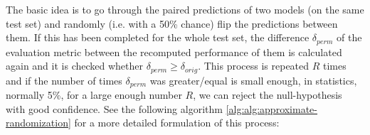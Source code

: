 




The basic idea is to go through the paired predictions of two models (on
the same test set) and
randomly (i.e. with a 50\% chance) flip the predictions between them. If
this has been completed for the whole test set, the difference $\delta_{perm}$ of the
evaluation metric between the recomputed performance of them is calculated again
and it is checked whether $\delta_{perm} \geq \delta_{orig}$. This process is repeated
$R$ times and if the number of times $\delta_{perm}$ was greater/equal is small
enough, in statistics, normally 5\%, for a large enough number $R$, we can reject
the null-hypothesis with good confidence. See the following algorithm \ref{alg:alg:approximate-randomization}
for a more detailed formulation of this process:

